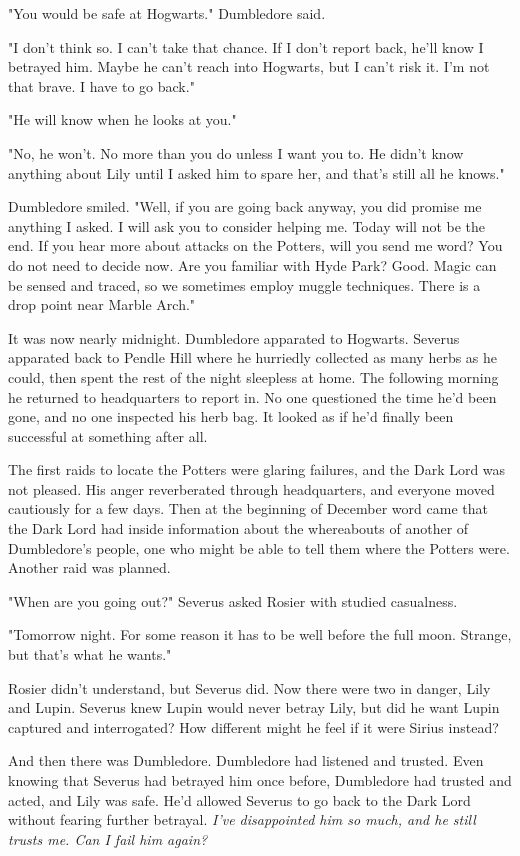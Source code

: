 \documentclass[a4paper,11pt]{article}
\begin{document}
"You would be safe at Hogwarts." Dumbledore said.

"I don't think so. I can't take that chance. If I don't report back, he'll know I betrayed him. Maybe he can't reach into Hogwarts, but I can't risk it. I'm not that brave. I have to go back."

"He will know when he looks at you."

"No, he won't. No more than you do unless I want you to. He didn't know anything about Lily until I asked him to spare her, and that's still all he knows."

Dumbledore smiled. "Well, if you are going back anyway, you did promise me anything I asked. I will ask you to consider helping me. Today will not be the end. If you hear more about attacks on the Potters, will you send me word? You do not need to decide now. Are you familiar with Hyde Park? Good. Magic can be sensed and traced, so we sometimes employ muggle techniques. There is a drop point near Marble Arch."

It was now nearly midnight. Dumbledore apparated to Hogwarts. Severus apparated back to Pendle Hill where he hurriedly collected as many herbs as he could, then spent the rest of the night sleepless at home. The following morning he returned to headquarters to report in. No one questioned the time he'd been gone, and no one inspected his herb bag. It looked as if he'd finally been successful at something after all.

The first raids to locate the Potters were glaring failures, and the Dark Lord was not pleased. His anger reverberated through headquarters, and everyone moved cautiously for a few days. Then at the beginning of December word came that the Dark Lord had inside information about the whereabouts of another of Dumbledore's people, one who might be able to tell them where the Potters were. Another raid was planned.

"When are you going out?" Severus asked Rosier with studied casualness.

"Tomorrow night. For some reason it has to be well before the full moon. Strange, but that's what he wants."

Rosier didn't understand, but Severus did. Now there were two in danger, Lily and Lupin. Severus knew Lupin would never betray Lily, but did he want Lupin captured and interrogated? How different might he feel if it were Sirius instead?

And then there was Dumbledore. Dumbledore had listened and trusted. Even knowing that Severus had betrayed him once before, Dumbledore had trusted and acted, and Lily was safe. He'd allowed Severus to go back to the Dark Lord without fearing further betrayal. \emph{I've disappointed him so much, and he still trusts me. Can I fail him again?}
\end{document}
